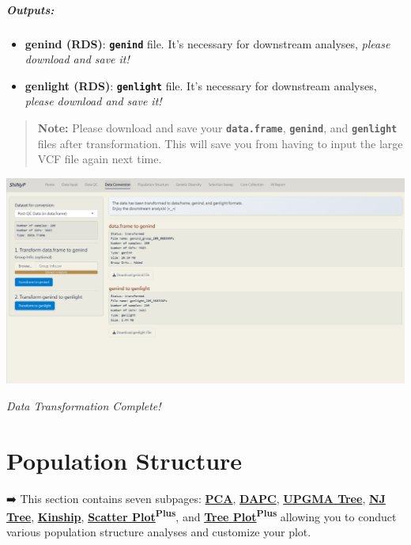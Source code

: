 \documentclass[
]{book}
\begin{document}
\paragraph*{Outputs:}\label{outputs-4}

\begin{itemize}
\item
  \textbf{genind (RDS)}: {\textbf{\texttt{genind}}} file. It's necessary for downstream analyses, \emph{please download and save it!}
\item
  \textbf{genlight (RDS)}: {\textbf{\texttt{genlight}}} file. It's necessary for downstream analyses, \emph{please download and save it!}
\end{itemize}

\begin{quote}
\textbf{Note:} Please download and save your {\textbf{\texttt{data.frame}}}, {\textbf{\texttt{genind}}}, and {\textbf{\texttt{genlight}}} files after transformation. This will save you from having to input the large VCF file again next time.
\end{quote}

\includegraphics{images/圖片22.png}

\emph{Data Transformation Complete!}

\chapter{Population Structure}\label{sec-population-structure}

➡️ This section contains seven subpages: \ul{\textbf{PCA}}, \ul{\textbf{DAPC}}, \ul{\textbf{UPGMA Tree}}, \ul{\textbf{NJ Tree}}, \ul{\textbf{Kinship}}, \ul{\textbf{Scatter Plot}}\textsuperscript{\textbf{Plus}}, and \ul{\textbf{Tree Plot}}\textsuperscript{\textbf{Plus}} allowing you to conduct various population structure analyses and customize your plot.
\end{document}
